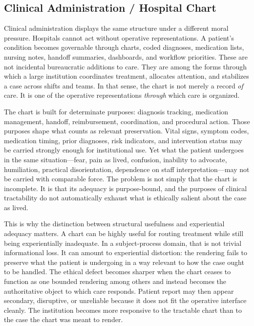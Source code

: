 \documentclass[11pt]{article}
\renewcommand{\emph}[1]{\textit{#1}}
\begin{document}
\subsection{Clinical Administration / Hospital Chart}

Clinical administration displays the same structure under a different moral pressure. Hospitals cannot act without operative representations. A patient's condition becomes governable through charts, coded diagnoses, medication lists, nursing notes, handoff summaries, dashboards, and workflow priorities. These are not incidental bureaucratic additions to care. They are among the forms through which a large institution coordinates treatment, allocates attention, and stabilizes a case across shifts and teams. In that sense, the chart is not merely a record \emph{of} care. It is one of the operative representations \emph{through} which care is organized. \cite{BowkerStar1999SortingThingsOut,Douglas2004IrreducibleComplexityObjectivity}

The chart is built for determinate purposes: diagnosis tracking, medication management, handoff, reimbursement, coordination, and procedural action. Those purposes shape what counts as relevant preservation. Vital signs, symptom codes, medication timing, prior diagnoses, risk indicators, and intervention status may be carried strongly enough for institutional use. Yet what the patient undergoes in the same situation---fear, pain as lived, confusion, inability to advocate, humiliation, practical disorientation, dependence on staff interpretation---may not be carried with comparable force. The problem is not simply that the chart is incomplete. It is that its adequacy is purpose-bound, and the purposes of clinical tractability do not automatically exhaust what is ethically salient about the case as lived. \cite{Douglas2004IrreducibleComplexityObjectivity,Fricker2007EpistemicInjustice,Swanson2026EmbeddedProcess}

This is why the distinction between structural usefulness and experiential adequacy matters. A chart can be highly useful for routing treatment while still being experientially inadequate. In a subject-process domain, that is not trivial informational loss. It can amount to experiential distortion: the rendering fails to preserve what the patient is undergoing in a way relevant to how the case ought to be handled. The ethical defect becomes sharper when the chart ceases to function as one bounded rendering among others and instead becomes the authoritative object to which care responds. Patient report may then appear secondary, disruptive, or unreliable because it does not fit the operative interface cleanly. The institution becomes more responsive to the tractable chart than to the case the chart was meant to render. \cite{BowkerStar1999SortingThingsOut,Fricker2007EpistemicInjustice,Swanson2026EmbeddedProcess}
\end{document}
